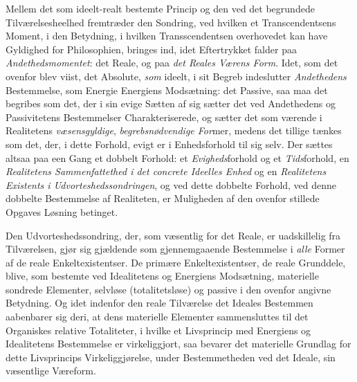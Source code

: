 Mellem det som ideelt-realt bestemte Princip og den ved det begrundede
Tilværelsesheelhed fremtræder den Sondring, ved hvilken et Transcendentsens
Moment, i den Betydning, i hvilken Transscendentsen overhovedet kan have
Gyldighed for Philosophien, bringes ind, idet Eftertrykket falder paa
\emph{Andethedsmomentet}: det Reale, og paa \emph{det Reales Værens Form}.
Idet, som det ovenfor blev viist, det Absolute, \emph{som} ideelt, i sit Begreb
indeslutter \emph{Andethedens} Bestemmelse, som Energie Energiens Modsætning:
det Passive, saa maa det begribes som det, der i sin evige Sætten af sig sætter
det ved Andethedens og Passivitetens
 Bestemmelser Charakteriserede, og sætter det som værende i Realitetens
\emph{væsensgyldige}, \emph{begrebsnødvendige For}mer, medens det tillige
tænkes som det, der, i dette Forhold, evigt er i Enhedsforhold til sig selv.
Der sættes altsaa paa een Gang et dobbelt Forhold: et \emph{Evigheds}forhold og
et \emph{Tids}forhold, en \emph{Realitetens Sammenfattethed i det concrete
Ideelles Enhed} og en \emph{Realitetens Existents i
Udvorteshedssondringen}, og ved dette dobbelte Forhold, ved denne dobbelte
Bestemmelse af Realiteten, er Muligheden af den ovenfor stillede Opgaves
Løsning betinget.

Den Udvorteshedssondring, der, som væsentlig for det Reale, er uadskillelig fra
Tilværelsen, gjør sig gjældende som gjennemgaaende Bestemmelse i \emph{alle}
Former af de reale Enkeltexistentser. De primære Enkeltexistentser, de reale
Grunddele, blive, som bestemte ved Idealitetens og Energiens Modsætning,
materielle sondrede Elementer, selvløse (totalitetsløse) og passive i den
ovenfor angivne Betydning. Og idet indenfor den reale Tilværelse det Ideales
Bestemmen aabenbarer sig deri, at dens materielle Elementer sammensluttes til
det Organiskes relative Totaliteter, i hvilke et Livsprincip med Energiens og
Idealitetens Bestemmelse er virkeliggjort, saa bevarer det materielle Grundlag
for dette Livsprincips Virkeliggjørelse, under Bestemmetheden ved det Ideale,
sin væsentlige Væreform.

